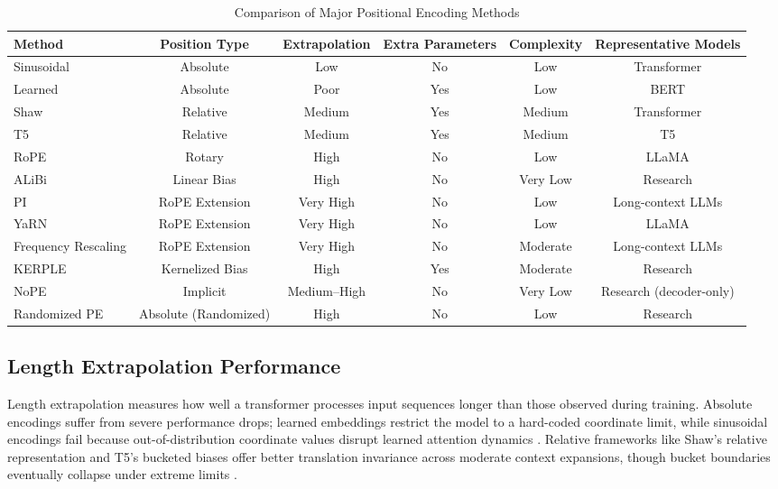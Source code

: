 \documentclass[conference]{IEEEtran}
\begin{document}
\begin{table}[!t]
\caption{Comparison of Major Positional Encoding Methods}
\label{tab:comparison}
\centering
\begin{tabular}{lccccc}
\hline
\textbf{Method} & \textbf{Position Type} & \textbf{Extrapolation} & \textbf{Extra Parameters} & \textbf{Complexity} & \textbf{Representative Models} \\
\hline
Sinusoidal & Absolute & Low & No & Low & Transformer \\
Learned & Absolute & Poor & Yes & Low & BERT \\
Shaw & Relative & Medium & Yes & Medium & Transformer \\
T5 & Relative & Medium & Yes & Medium & T5 \\
RoPE & Rotary & High & No & Low & LLaMA \\
ALiBi & Linear Bias & High & No & Very Low & Research \\
PI & RoPE Extension & Very High & No & Low & Long-context LLMs \\
YaRN & RoPE Extension & Very High & No & Low & LLaMA \\
Frequency Rescaling & RoPE Extension & Very High & No & Moderate & Long-context LLMs \\
KERPLE & Kernelized Bias & High & Yes & Moderate & Research \\
NoPE & Implicit & Medium--High & No & Very Low & Research (decoder-only) \\
Randomized PE & Absolute (Randomized) & High & No & Low & Research \\
\hline
\end{tabular}
\end{table}

\subsection{Length Extrapolation Performance}

Length extrapolation measures how well a transformer processes input sequences longer than those observed during training. Absolute encodings suffer from severe performance drops; learned embeddings restrict the model to a hard-coded coordinate limit, while sinusoidal encodings fail because out-of-distribution coordinate values disrupt learned attention dynamics \cite{press2022}. Relative frameworks like Shaw's relative representation and T5's bucketed biases offer better translation invariance across moderate context expansions, though bucket boundaries eventually collapse under extreme limits \cite{shaw2018,raffel2020}.
\end{document}
